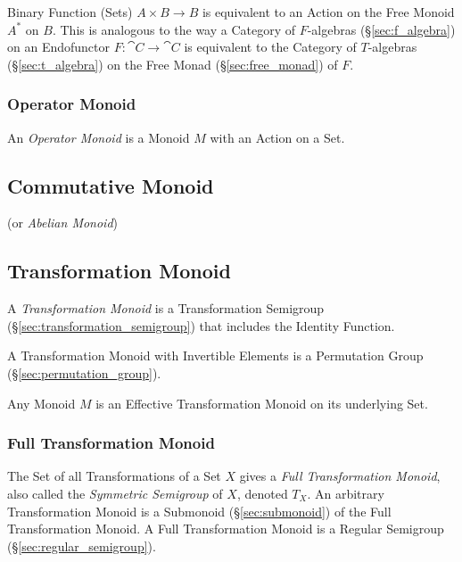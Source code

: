 Binary Function (Sets) $A \times B \rightarrow B$ is equivalent to an
Action on the Free Monoid $A^*$ on $B$. This is analogous to the way a
Category of $F$-algebras (\S\ref{sec:f_algebra}) on an Endofunctor $F
: \cat{C} \rightarrow \cat{C}$ is equivalent to the Category of
$T$-algebras (\S\ref{sec:t_algebra}) on the Free Monad
(\S\ref{sec:free_monad}) of $F$.



\subsubsection{Operator Monoid}\label{sec:operator_monoid}

An \emph{Operator Monoid} is a Monoid $M$ with an Action on a Set.



\subsection{Commutative Monoid}\label{sec:commutative_monoid}

(or \emph{Abelian Monoid})



\subsection{Transformation Monoid}\label{sec:transformation_monoid}

A \emph{Transformation Monoid} is a Transformation Semigroup
(\S\ref{sec:transformation_semigroup}) that includes the Identity
Function.

A Transformation Monoid with Invertible Elements is a Permutation
Group (\S\ref{sec:permutation_group}).

Any Monoid $M$ is an Effective Transformation Monoid on its underlying
Set.



\subsubsection{Full Transformation Monoid}\label{sec:full_transformation}

The Set of all Transformations of a Set $X$ gives a \emph{Full
  Transformation Monoid}, also called the \emph{Symmetric Semigroup}
of $X$, denoted $T_X$. An arbitrary Transformation Monoid is a
Submonoid (\S\ref{sec:submonoid}) of the Full Transformation Monoid. A
Full Transformation Monoid is a Regular Semigroup
(\S\ref{sec:regular_semigroup}).



